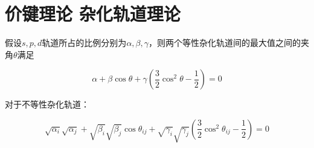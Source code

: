 
\section{价键理论 杂化轨道理论}

假设$s,p,d$轨道所占的比例分别为$\alpha, \beta, \gamma$，则两个等性杂化轨道间的最大值之间的夹角$\theta$满足





\begin{equation*}
	\alpha + \beta \cos \theta + \gamma \left(\frac{3}{2}\cos ^2 \theta - \frac{1}{2}\right) = 0
\end{equation*}

对于不等性杂化轨道：

\begin{equation*}
	\sqrt{\alpha_i} \sqrt{\alpha_j} + \sqrt{\beta_i}{\sqrt{\beta_j}} \cos \theta_{ij} + \sqrt{\gamma_i}\sqrt{\gamma_j} \left( \frac{3}{2} \cos ^2 \theta_{ij} - \frac{1}{2}  \right)= 0
\end{equation*}
